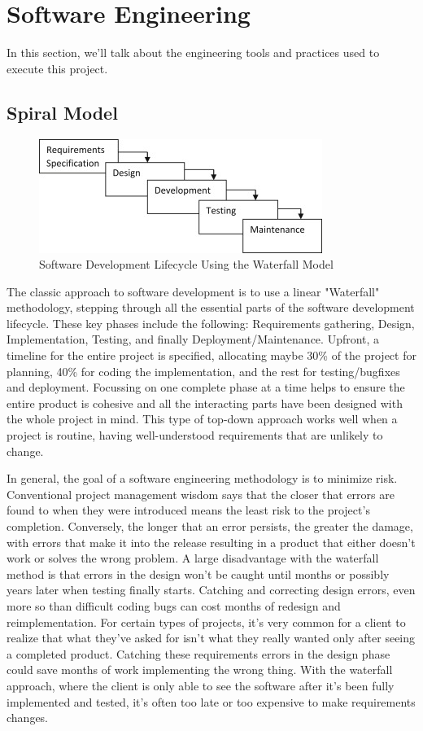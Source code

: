 \documentclass[12pt,a4paper,twoside,openright]{report}
\begin{document}
\section{Software Engineering}
In this section, we'll talk about the engineering tools and practices used to execute this project.
\subsection{Spiral Model}
\begin{figure}[tbh]
\centerline{\includegraphics{waterfall}}
\caption{Software Development Lifecycle Using the Waterfall Model}
\label{waterfallfig}
\end{figure}
The classic approach to software development is to use a linear "Waterfall" methodology, stepping through all the essential parts of the software development lifecycle.
These key phases include the following: Requirements gathering, Design, Implementation, Testing, and finally Deployment/Maintenance.
Upfront, a timeline for the entire project is specified, allocating maybe 30\% of the project for planning, 40\% for coding the implementation, and the rest for testing/bugfixes and deployment.
Focussing on one complete phase at a time helps to ensure the entire product is cohesive and all the interacting parts have been designed with the whole project in mind.
This type of top-down approach works well when a project is routine, having well-understood requirements that are unlikely to change.

In general, the goal of a software engineering methodology is to minimize risk.
Conventional project management wisdom says that the closer that errors are found to when they were introduced means the least risk to the project's completion.
Conversely, the longer that an error persists, the greater the damage, with errors that make it into the release resulting in a product that either doesn't work or solves the wrong problem.
A large disadvantage with the waterfall method is that errors in the design won't be caught until months or possibly years later when testing finally starts.
Catching and correcting design errors, even more so than difficult coding bugs can cost months of redesign and reimplementation.
For certain types of projects, it's very common for a client to realize that what they've asked for isn't what they really wanted only after seeing a completed product.
Catching these requirements errors in the design phase could save months of work implementing the wrong thing.
With the waterfall approach, where the client is only able to see the software after it's been fully implemented and tested, it's often too late or too expensive to make requirements changes.
\end{document}

